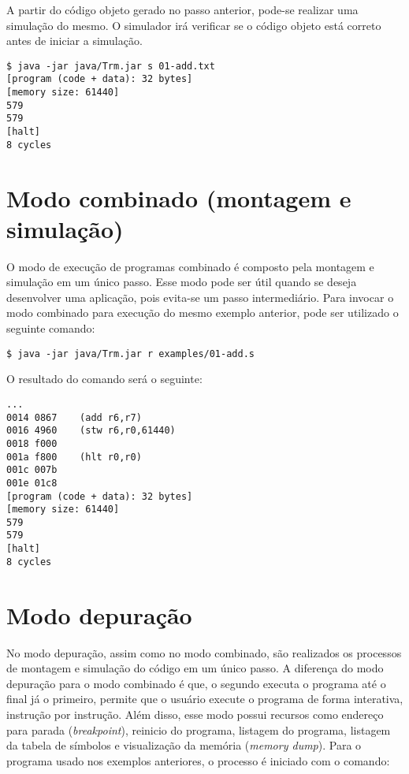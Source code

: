 \documentclass[11pt,a4paper]{report}
\begin{document}
A partir do código objeto gerado no passo anterior, pode-se realizar uma
simulação do mesmo. O simulador irá verificar se o código objeto está
correto antes de iniciar a simulação.

\begin{verbatim}
$ java -jar java/Trm.jar s 01-add.txt
[program (code + data): 32 bytes]
[memory size: 61440]
579
579
[halt]
8 cycles
\end{verbatim}

\section{Modo combinado (montagem e simulação)}

O modo de execução de programas combinado é composto pela montagem e
simulação em um único passo. Esse modo pode ser útil quando se deseja
desenvolver uma aplicação, pois evita-se um passo intermediário. Para
invocar o modo combinado para execução do mesmo exemplo anterior, pode
ser utilizado o seguinte comando:

\begin{verbatim}
$ java -jar java/Trm.jar r examples/01-add.s
\end{verbatim}

O resultado do comando será o seguinte:

\begin{verbatim}
...
0014 0867    (add r6,r7)
0016 4960    (stw r6,r0,61440)
0018 f000
001a f800    (hlt r0,r0)
001c 007b
001e 01c8
[program (code + data): 32 bytes]
[memory size: 61440]
579
579
[halt]
8 cycles
\end{verbatim}

\section{Modo depuração}

No modo depuração, assim como no modo combinado, são realizados os
processos de montagem e simulação do código em um único passo. A
diferença do modo depuração para o modo combinado é que, o segundo
executa o programa até o final já o primeiro, permite que o usuário
execute o programa de forma interativa, instrução por instrução. Além
disso, esse modo possui recursos como endereço para parada
(\textit{breakpoint}), reinicio do programa, listagem do programa,
listagem da tabela de símbolos e visualização da memória (\textit{memory
dump}). Para o programa usado nos exemplos anteriores, o processo é
iniciado com o comando:
\end{document}
